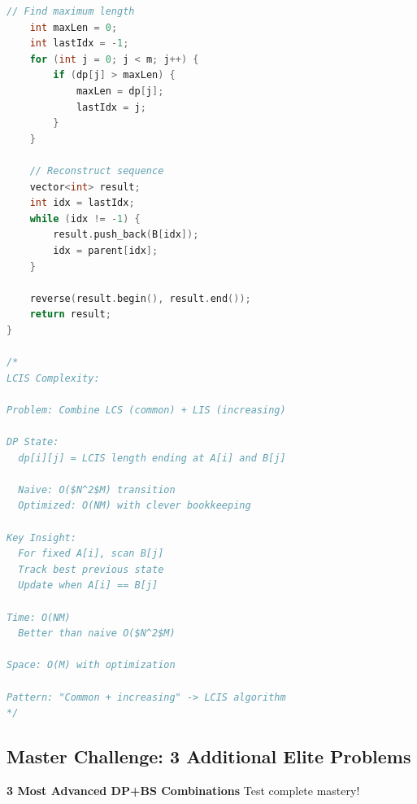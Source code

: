 \documentclass[11pt,a4paper,oneside]{book}
\begin{document}
\begin{lstlisting}[language=C++, caption=Convex Hull Trick Solutions - NEW PROBLEMS]
    // Find maximum length
    int maxLen = 0;
    int lastIdx = -1;
    for (int j = 0; j < m; j++) {
        if (dp[j] > maxLen) {
            maxLen = dp[j];
            lastIdx = j;
        }
    }
    
    // Reconstruct sequence
    vector<int> result;
    int idx = lastIdx;
    while (idx != -1) {
        result.push_back(B[idx]);
        idx = parent[idx];
    }
    
    reverse(result.begin(), result.end());
    return result;
}

/*
LCIS Complexity:

Problem: Combine LCS (common) + LIS (increasing)

DP State:
  dp[i][j] = LCIS length ending at A[i] and B[j]
  
  Naive: O($N^2$M) transition
  Optimized: O(NM) with clever bookkeeping

Key Insight:
  For fixed A[i], scan B[j]
  Track best previous state
  Update when A[i] == B[j]

Time: O(NM)
  Better than naive O($N^2$M)
  
Space: O(M) with optimization

Pattern: "Common + increasing" -> LCIS algorithm
*/
\end{lstlisting}

\subsection{Master Challenge: 3 Additional Elite Problems}

\begin{tcolorbox}[
    enhanced,breakable,
    colback=dangered!10,
    colframe=dangered,
    boxrule=2pt,
    arc=4mm,
    title=\textbf{ELITE DP+BS PROBLEMS}
]
\textbf{3 Most Advanced DP+BS Combinations}
Test complete mastery!
\end{tcolorbox}
\end{document}
